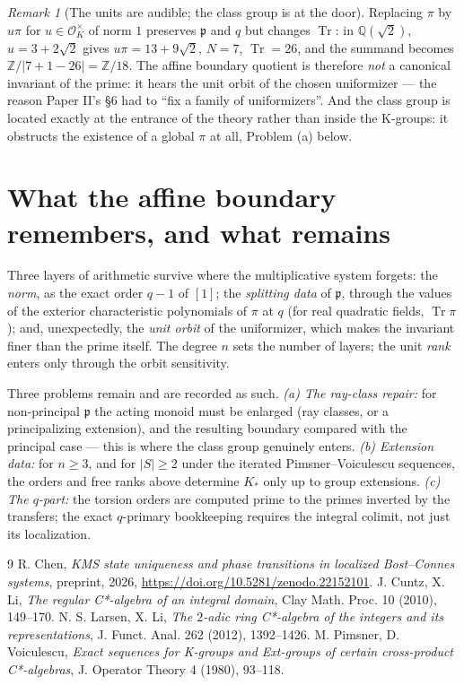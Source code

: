 \documentclass[11pt]{amsart}
\theoremstyle{remark}
\newtheorem{remark}[theorem]{Remark}
\newcommand{\OK}{\mathcal{O}_K}
\newcommand{\pp}{\mathfrak{p}}
\newcommand{\Z}{\mathbb{Z}}
\newcommand{\Q}{\mathbb{Q}}
\newcommand{\Ns}{N}
\newcommand{\Tr}{\operatorname{Tr}}
\begin{document}
\begin{remark}[The units are audible; the class group is at the door]\label{rem:units}
Replacing $\pi$ by $u\pi$ for $u\in\OK^\times$ of norm $1$ preserves $\pp$ and $q$ but
changes $\Tr$: in $\Q(\sqrt2)$, $u=3+2\sqrt2$ gives $u\pi=13+9\sqrt2$, $\Ns=7$,
$\Tr=26$, and the summand becomes $\Z/|7+1-26|=\Z/18$. The affine boundary quotient is
therefore \emph{not} a canonical invariant of the prime: it hears the unit orbit of the
chosen uniformizer --- the reason Paper II's \S6 had to ``fix a family of uniformizers''.
And the class group is located exactly at the entrance of the theory rather than inside
the K-groups: it obstructs the existence of a global $\pi$ at all, Problem (a) below.
\end{remark}

\section{What the affine boundary remembers, and what remains}\label{sec:honest}

Three layers of arithmetic survive where the multiplicative system forgets: the
\emph{norm}, as the exact order $q-1$ of $[1]$; the \emph{splitting data} of $\pp$,
through the values of the exterior characteristic polynomials of $\pi$ at $q$ (for real
quadratic fields, $\Tr\pi$); and, unexpectedly, the \emph{unit orbit} of the uniformizer,
which makes the invariant finer than the prime itself. The degree $n$ sets the number of
layers; the unit \emph{rank} enters only through the orbit sensitivity.

Three problems remain and are recorded as such. \emph{(a) The ray-class repair:} for
non-principal $\pp$ the acting monoid must be enlarged (ray classes, or a principalizing
extension), and the resulting boundary compared with the principal case --- this is where
the class group genuinely enters. \emph{(b) Extension data:} for $n\ge3$, and for
$|S|\ge2$ under the iterated Pimsner--Voiculescu sequences, the orders and free ranks
above determine $K_*$ only up to group extensions. \emph{(c) The $q$-part:} the torsion
orders are computed prime to the primes inverted by the transfers; the exact $q$-primary
bookkeeping requires the integral colimit, not just its localization.

\begin{thebibliography}{9}
 R. Chen, \emph{KMS state uniqueness and phase transitions in localized Bost--Connes systems}, preprint, 2026, \newline\url{https://doi.org/10.5281/zenodo.22152101}.
 J. Cuntz, X. Li, \emph{The regular C*-algebra of an integral domain}, Clay Math. Proc. 10 (2010), 149--170.
 N. S. Larsen, X. Li, \emph{The $2$-adic ring C*-algebra of the integers and its representations}, J. Funct. Anal. 262 (2012), 1392--1426.
 M. Pimsner, D. Voiculescu, \emph{Exact sequences for K-groups and Ext-groups of certain cross-product C*-algebras}, J. Operator Theory 4 (1980), 93--118.
\end{thebibliography}
\end{document}
